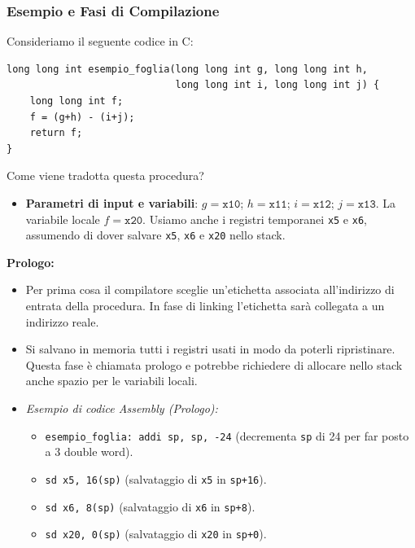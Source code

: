 \documentclass[12pt, a4paper]{article}
\begin{document}
\subsubsection{Esempio e Fasi di Compilazione}
Consideriamo il seguente codice in C:
\begin{verbatim}
long long int esempio_foglia(long long int g, long long int h, 
                             long long int i, long long int j) {
    long long int f;
    f = (g+h) - (i+j);
    return f;
}
\end{verbatim}
Come viene tradotta questa procedura?
\begin{itemize}
    \item \textbf{Parametri di input e variabili}: $g = \texttt{x10}$; $h = \texttt{x11}$; $i = \texttt{x12}$; $j = \texttt{x13}$. La variabile locale $f = \texttt{x20}$. Usiamo anche i registri temporanei \texttt{x5} e \texttt{x6}, assumendo di dover salvare \texttt{x5}, \texttt{x6} e \texttt{x20} nello stack.
\end{itemize}

\textbf{Prologo:}
\begin{itemize}
    \item Per prima cosa il compilatore sceglie un'etichetta associata all'indirizzo di entrata della procedura. In fase di linking l'etichetta sarà collegata a un indirizzo reale.
    \item Si salvano in memoria tutti i registri usati in modo da poterli ripristinare. Questa fase è chiamata prologo e potrebbe richiedere di allocare nello stack anche spazio per le variabili locali.
    \item \textit{Esempio di codice Assembly (Prologo):}
    \begin{itemize}
        \item \texttt{esempio\_foglia: addi sp, sp, -24} (decrementa \texttt{sp} di 24 per far posto a 3 double word).
        \item \texttt{sd x5, 16(sp)} (salvataggio di \texttt{x5} in \texttt{sp+16}).
        \item \texttt{sd x6, 8(sp)} (salvataggio di \texttt{x6} in \texttt{sp+8}).
        \item \texttt{sd x20, 0(sp)} (salvataggio di \texttt{x20} in \texttt{sp+0}).
    \end{itemize}
\end{itemize}
\end{document}
